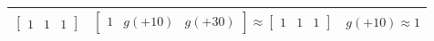\begin{itemize}
\begin{table}[H]
\begin{tabular}{ccc}
            $\left[{\begin{array}{ccc} 1 & 1 & 1 \end{array}}\right]$  & $\left[{\begin{array}{ccc} 1 & g(+10) & g(+30) \end{array}}\right] \approx \left[{\begin{array}{ccc} 1 & 1 & 1 \end{array}}\right]$ & $g(+10) \approx 1$ \\[1ex]
            \hline\hline %
        \end{tabular}
    \end{table}    
\end{itemize}
        